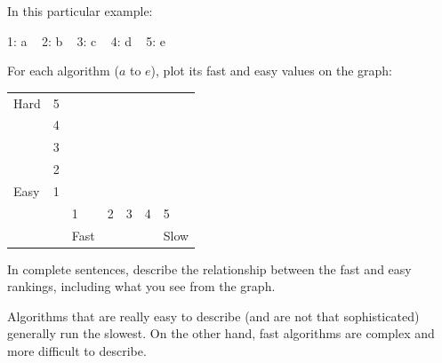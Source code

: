 \begin{answer}
In this particular example:

1: a ~ 2: b ~ 3: c ~ 4: d ~ 5: e
\end{answer}


\Q For each algorithm ($a$ to $e$), plot its fast and easy values on the graph:

\newcommand{\X}{\ans{X}}

\begin{table}[h]
\centering
\renewcommand{\arraystretch}{1.6}
\begin{tabularx}{275pt}{X C{28pt} | C{28pt} C{28pt} C{28pt} C{28pt} C{28pt}}
Hard & 5 & \X                    \\
     & 4 &    & \X               \\
     & 3 &    &   & \X           \\
     & 2 &    &   &   & \X       \\
Easy & 1 &    &   &   &   & \X   \\
\hline
     & & 1    & 2 & 3 & 4 & 5    \\
     & & Fast &   &   &   & Slow \\
\end{tabularx}
\end{table}


\Q In complete sentences, describe the relationship between the fast and easy rankings, including what you see from the graph.

\begin{answer}
Algorithms that are really easy to describe (and are not that sophisticated) generally run the slowest.
On the other hand, fast algorithms are complex and more difficult to describe.
\end{answer}
